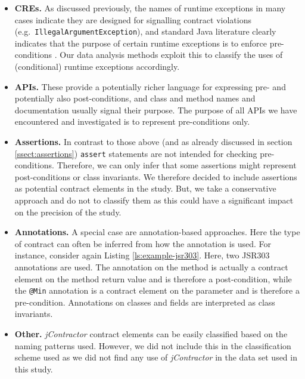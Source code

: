 \documentclass[a4paper,UKenglish]{lipics-v2016}
\begin{document}
\begin{itemize} 
	
	\item{\bf CREs.}   As discussed previously, the names of runtime exceptions in many cases indicate they are designed for signalling contract violations (e.g.\ \texttt{IllegalArgument\-Exception}), and standard Java literature clearly indicates that the purpose of certain runtime exceptions is to enforce pre-conditions \cite[item 58]{bloch2008effective}.  Our data analysis methods exploit this to classify the uses of (conditional) runtime exceptions accordingly.
	
	\item{\bf APIs.}  These provide a potentially richer language for expressing  pre- and potentially also post-conditions, and class and method names and documentation usually signal their purpose. The purpose of all APIs we have encountered and investigated is to represent pre-conditions only.
	
	\item{\bf Assertions.} In contrast to those above (and as already discussed in section \ref{ssect:assertions}) \texttt{assert} statements are not intended for checking pre-conditions. Therefore, we can only infer that some assertions might represent post-conditions or class invariants. We therefore decided to include assertions as potential contract elements in the study. But, we take a conservative approach and do not to classify them as this could have a significant impact on the precision of the study.
	
	\item{\bf Annotations.}  A special case are annotation-based approaches. Here the type of contract can often be inferred from how the annotation is used. For instance, consider again Listing \ref{ls:example-jsr303}. Here, two JSR303 annotations are used.  The annotation on the method is actually a contract element on the method return value and is therefore a post-condition, while the \texttt{@Min} annotation is a contract element on the parameter and is therefore a pre-condition. Annotations on classes and fields are interpreted as class invariants.
	
	\item{\bf Other.}  \textit{jContractor} contract elements can be easily classified based on the naming patterns used. However, we did not include this in the classification scheme used as we did not find any use of \textit{jContractor} in the data set used in this study.
\end{itemize}
\end{document}
